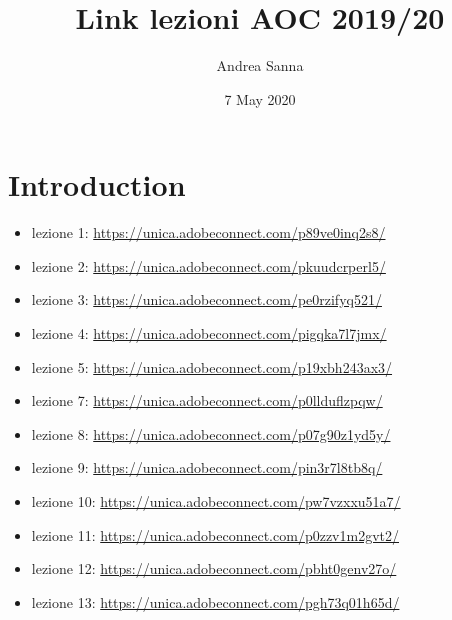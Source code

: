\documentclass{article}
\title{Link lezioni AOC 2019/20}
\author{Andrea Sanna}
\date{7 May 2020}
\begin{document}
\maketitle

\section{Introduction}
\begin{itemize}
\item lezione 1: \url{https://unica.adobeconnect.com/p89ve0inq2s8/}\\
\item lezione 2: \url{https://unica.adobeconnect.com/pkuudcrperl5/}\\
\item lezione 3: \url{https://unica.adobeconnect.com/pe0rzifyq521/}\\
\item lezione 4: \url{https://unica.adobeconnect.com/pigqka7l7jmx/}\\
\item lezione 5: \url{https://unica.adobeconnect.com/p19xbh243ax3/}\\
\item lezione 7: \url{https://unica.adobeconnect.com/p0llduflzpqw/}\\
\item lezione 8: \url{https://unica.adobeconnect.com/p07g90z1yd5y/}\\
\item lezione 9: \url{https://unica.adobeconnect.com/pin3r7l8tb8q/}\\
\item lezione 10: \url{https://unica.adobeconnect.com/pw7vzxxu51a7/}\\
\item lezione 11: \url{https://unica.adobeconnect.com/p0zzv1m2gvt2/}\\
\item lezione 12: \url{https://unica.adobeconnect.com/pbht0genv27o/}\\
\item lezione 13: \url{https://unica.adobeconnect.com/pgh73q01h65d/}\\
\end{itemize}
\end{document}
